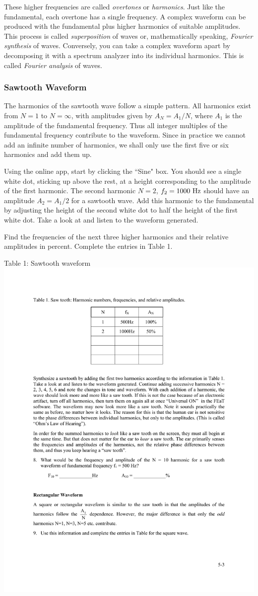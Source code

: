 \documentclass[11pt]{NSF}
\def\i{\item{}}
\begin{document}
These higher frequencies are called {\em overtones} or {\em harmonics}. 
Just like the
fundamental, each overtone has a single frequency. A complex waveform can be
produced with the fundamental plus higher harmonics of suitable amplitudes.
This process is called {\em superposition} of waves or, mathematically speaking,
{\em Fourier synthesis} of waves. Conversely, you can take a complex waveform apart
by decomposing it with a spectrum analyzer into its individual harmonics. This is
called {\em Fourier analysis} of waves.

\subsubsection{Sawtooth Waveform}

The harmonics of the sawtooth wave follow a simple pattern. All harmonics
exist from $N=1$ to $N=\infty$, with amplitudes given by 
$A_N = A_1/N$, where $A_1$ is the amplitude of the fundamental frequency.
Thus all integer multiples of the fundamental frequency
contribute to the waveform. 
Since in practice we cannot add an infinite number
of harmonics, we shall only use the first five or six harmonics
and add them up.

Using the online app, start by clicking the ``Sine" box.
You should see a single white dot, sticking up above the rest,
at a height corresponding to the amplitude of the first harmonic.
The second harmonic $N=2$, $f_2=1000~{\rm Hz}$ should have an 
amplitude $A_2=A_1/2$ for a sawtooth wave. 
Add this harmonic to the fundamental by adjusting the height 
of the second white dot to half the height of the first white dot. 
Take a look at and listen to the waveform generated.

Find the frequencies of the next three higher harmonics 
and their relative amplitudes in percent. 
Complete the entries in Table 1.
%
\begin{table}[hbtp]
\begin{center}
Table 1: Sawtooth waveform\\
\includegraphics[width=.35\textwidth]{tab5_1}
\label{t:1}
\end{center}
\end{table}
%
\end{document}
